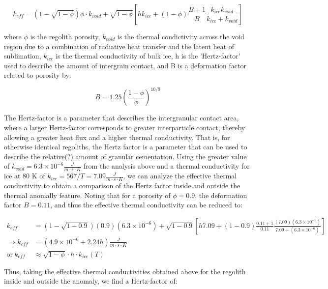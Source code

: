 \documentclass[11pt]{article} %
\begin{document}
	\begin{equation}
	k_{eff} = (1-\sqrt{1-\phi})\phi \cdot k_{void} + \sqrt{1-\phi}[hk_{ice}+(1-\phi)\frac{B+1}{B}\frac{k_{ice}k_{void}}{k_{ice}+k_{void}}]
	\end{equation}
	
	where $\phi$ is the regolith porosity, $k_{void}$ is the thermal condictivity across the void region due to a combination of radiative heat transfer and the latent heat of sublimation, $k_{ice}$ is the thermal conductivity of bulk ice, h is the 'Hertz-factor' used to describe the amount of intergrain contact, and B is a deformation factor related to porosity by:
	
	\begin{equation}
	B = 1.25 ( \frac{1-\phi}{\phi} )^{10/9}
	\end{equation}
	
	The Hertz-factor is a parameter that describes the intergranular contact area, where a larger Hertz-factor corresponds to greater interparticle contact, thereby allowing a greater heat flux and a higher thermal conductivity. That is, for otherwise identical regoliths, the Hertz factor is a parameter that can be used to describe the relative(?) amount of granular cementation. Using the greater value of $k_{void} = 6.3\times10^{-6} \frac{J}{m \cdot s \cdot K}$ from the analysis above and a thermal conductivity for ice at 80 K of $k_{ice} = 567/T = 7.09 \frac{J}{m \cdot s \cdot K}$, we can analyze the effective thermal conductivity to obtain a comparison of the Hertz factor inside and outside the thermal anomally feature. 
	Noting that for a porosity of $\phi = 0.9$, the deformation factor $B = 0.11$, and thus the effective thermal conductivity can be reduced to:
	
	\begin{equation}
	\begin{split}
	k_{eff} &= (1-\sqrt{1-0.9})(0.9)(6.3\times10^{-6}) + \sqrt{1-0.9}[h 7.09+(1-0.9)\frac{0.11+1}{0.11}\frac{(7.09)(6.3\times10^{-6})}{7.09+(6.3\times10^{-6})}] \\
	\Rightarrow k_{eff} &= ( 4.9\times 10^{-6} + 2.24 h )  \frac{J}{m \cdot s \cdot K} \\
	\text{or} \: k_{eff} &\approx \sqrt{1-\phi}\cdot h\cdot k_{ice}(T)
	\end{split}
	\end{equation}
	
	Thus, taking the effective thermal conductivities obtained above for the regolith inside and outside the anomaly, we find a Hertz-factor of:
	
\end{document}
